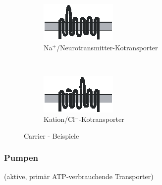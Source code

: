 \documentclass[10pt,a4paper]{report}
\begin{document}
\begin{figure}[h]
    \centering
    \begin{subfigure}[b]{0.2\textwidth}
        \includegraphics[width=\textwidth]{Bilder/carrier1.png}
        \caption{Na$^+$/Neurotransmitter-Kotransporter}
        \label{fig:neurotransmitterkotransporter}
    \end{subfigure}
    ~ %
    \begin{subfigure}[b]{0.2\textwidth}
        \includegraphics[width=\textwidth]{Bilder/carrier2.png}
        \caption{Kation/Cl$^-$-Kotransporter}
        \label{fig:kationencarrier}
    \end{subfigure}
    \caption{Carrier - Beispiele}
    \label{fig:carrierbsp}
\end{figure}

\subsubsection{Pumpen} 
(aktive, primär ATP-verbrauchende Transporter)\\
\end{document}
